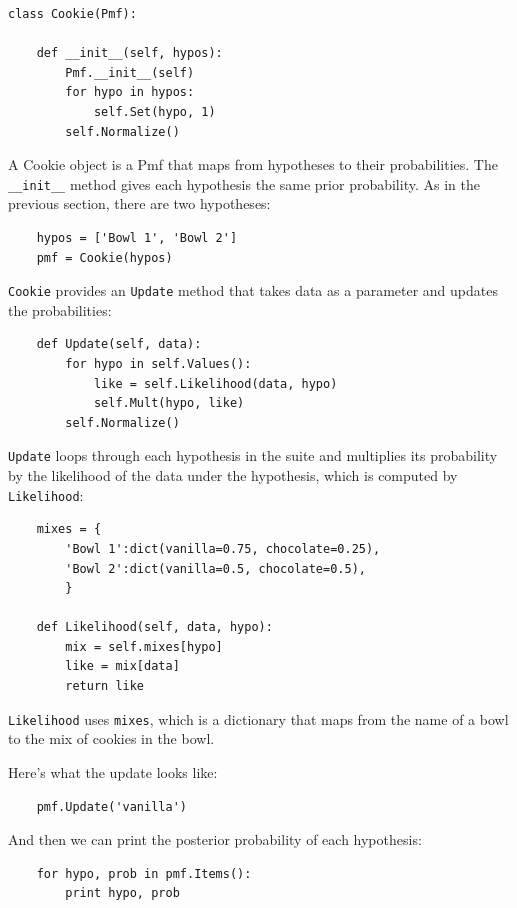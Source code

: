 \documentclass[12pt]{book}
\begin{document}
\begin{verbatim}
class Cookie(Pmf):

    def __init__(self, hypos):
        Pmf.__init__(self)
        for hypo in hypos:
            self.Set(hypo, 1)
        self.Normalize()
\end{verbatim}

A Cookie object is a Pmf that maps from hypotheses to their
probabilities.  The \verb"__init__" method gives each hypothesis
the same prior probability.  As in the previous section, there are
two hypotheses:

\begin{verbatim}
    hypos = ['Bowl 1', 'Bowl 2']
    pmf = Cookie(hypos)
\end{verbatim}

\verb"Cookie" provides an \verb"Update" method that takes
data as a parameter and updates the probabilities:

\begin{verbatim}
    def Update(self, data):
        for hypo in self.Values():
            like = self.Likelihood(data, hypo)
            self.Mult(hypo, like)
        self.Normalize()
\end{verbatim}

\verb"Update" loops through each hypothesis in the suite
and multiplies its probability by the likelihood of the
data under the hypothesis, which is computed by \verb"Likelihood":

\begin{verbatim}
    mixes = {
        'Bowl 1':dict(vanilla=0.75, chocolate=0.25),
        'Bowl 2':dict(vanilla=0.5, chocolate=0.5),
        }

    def Likelihood(self, data, hypo):
        mix = self.mixes[hypo]
        like = mix[data]
        return like
\end{verbatim}

\verb"Likelihood" uses \verb"mixes", which is a dictionary
that maps from the name of a bowl to the mix of cookies in
the bowl.

Here's what the update looks like:

\begin{verbatim}
    pmf.Update('vanilla')
\end{verbatim}

And then we can print the posterior probability of each hypothesis:

\begin{verbatim}
    for hypo, prob in pmf.Items():
        print hypo, prob
\end{verbatim}
\end{document}
